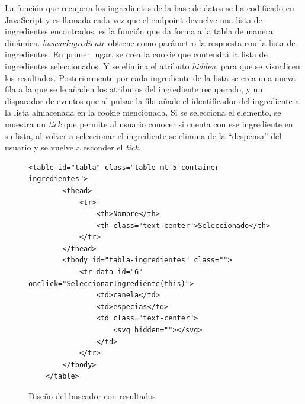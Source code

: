 La función que recupera los ingredientes de la base de datos se ha codificado en JavaScript y es llamada cada vez que el \gls{endpoint} devuelve una lista de ingredientes encontrados, es la función que da forma a la tabla de manera dinámica. \textit{buscarIngrediente} obtiene como parámetro la respuesta con la lista de ingredientes. En primer lugar, se crea la \gls{cookie} que contendrá la lista de ingredientes seleccionados. Y se elimina el atributo \textit{hidden}, para que se visualicen los resultados. Posteriormente por cada ingrediente de la lista se crea una nueva fila a la que se le añaden los atributos del ingrediente recuperado, y un disparador de eventos que al pulsar la fila añade el identificador del ingrediente a la lista almacenada en la \gls{cookie} mencionada. Si se selecciona el elemento, se muestra un \textit{tick} que permite al usuario conocer si cuenta con ese ingrediente en su lista, al volver a seleccionar el ingrediente se elimina de la ``despensa'' del usuario y se vuelve a esconder el \textit{tick}.
\begin{figure}[h!]
\centering
{}
\label{fig:buscador-tabla}
\begin{lstlisting}[style=consola]
    <table id="tabla" class="table mt-5 container ingredientes">
        <thead>
            <tr>
                <th>Nombre</th>
                <th class="text-center">Seleccionado</th>
            </tr>
        </thead>
        <tbody id="tabla-ingredientes" class="">
            <tr data-id="6" onclick="SeleccionarIngrediente(this)">
                <td>canela</td>
                <td>especias</td>
                <td class="text-center">
                    <svg hidden=""></svg>
                </td>
            </tr>
        </tbody>
    </table>
\end{lstlisting}
\caption{Diseño del buscador con resultados}
\end{figure}

